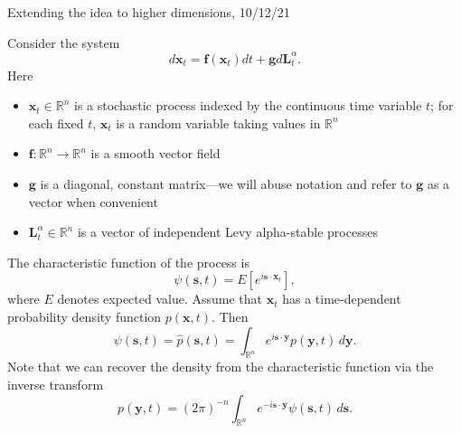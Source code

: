 \documentclass[12pt]{article}
\begin{document}
\begin{center} Extending the idea to higher dimensions, 10/12/21 \end{center}

Consider the system
\[
d \mathbf{x}_t = \mathbf{f}(\mathbf{x}_t) dt + \mathbf{g} d\mathbf{L}_t^\alpha.
\]
Here
\begin{itemize}
\item $\mathbf{x}_t \in \mathbb{R}^n$ is a stochastic process indexed by the continuous time variable $t$; for each fixed $t$, $\mathbf{x}_t$ is a random variable taking values in $\mathbb{R}^n$
\item $\mathbf{f} : \mathbb{R}^n \to \mathbb{R}^n$ is a smooth vector field
\item $\mathbf{g}$ is a diagonal, constant matrix---we will abuse notation and refer to $\mathbf{g}$ as a vector when convenient
\item $\mathbf{L}_t^\alpha \in \mathbb{R}^n$ is a vector of independent Levy alpha-stable processes
\end{itemize}
The characteristic function of the process is
\[
\psi(\mathbf{s}, t) = E[e^{i \mathbf{s} \cdot \mathbf{x}_t}],
\]
where $E$ denotes expected value.  Assume that $\mathbf{x}_t$ has a time-dependent probability density function $p(\mathbf{x},t)$.  Then
\[
\psi(\mathbf{s}, t) = \widehat{p}(\mathbf{s},t) = \int_{\mathbb{R}^n} e^{i \mathbf{s} \cdot \mathbf{y}} p(\mathbf{y},t) \, d \mathbf{y}.
\]
Note that we can recover the density from the characteristic function via the inverse transform
\[
p(\mathbf{y},t) = (2 \pi)^{-n} \int_{\mathbb{R}^n} e^{-i \mathbf{s} \cdot \mathbf{y}} \psi(\mathbf{s},t) \, d \mathbf{s}.
\]
\end{document}
